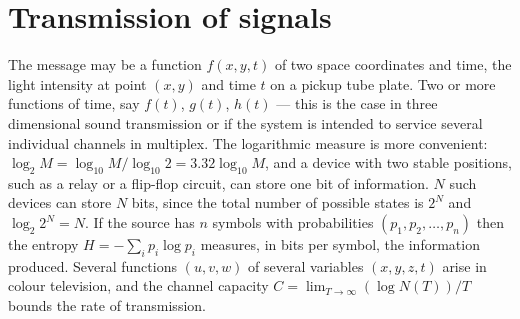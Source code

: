 \documentclass[10pt]{article}
\begin{document}
\section*{Transmission of signals}
The message may be a function $f(x, y, t)$ of two space coordinates and time,
the light intensity at point $(x, y)$ and time $t$ on a pickup tube plate. Two or
more functions of time, say $f(t)$, $g(t)$, $h(t)$ --- this is the case in
three dimensional sound transmission or if the system is intended to service
several individual channels in multiplex. The logarithmic measure is more
convenient: $\log_2 M = \log_{10} M / \log_{10} 2 = 3.32 \log_{10} M$, and a
device with two stable positions, such as a relay or a flip-flop circuit, can
store one bit of information. $N$ such devices can store $N$ bits, since the
total number of possible states is $2^N$ and $\log_2 2^N = N$.
If the source has $n$ symbols with probabilities $(p_1, p_2, \ldots, p_n)$
then the entropy $H = -\sum_{i} p_i \log p_i$ measures, in bits per symbol,
the information produced. Several functions $(u, v, w)$ of several variables
$(x, y, z, t)$ arise in colour television, and the channel capacity
$C = \lim_{T\to\infty} (\log N(T))/T$ bounds the rate of transmission.
\end{document}
